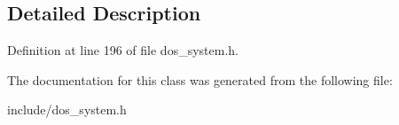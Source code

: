 \subsection{Detailed Description}


Definition at line 196 of file dos\-\_\-system.\-h.



The documentation for this class was generated from the following file\-:\begin{DoxyCompactItemize}
\item 
include/dos\-\_\-system.\-h\end{DoxyCompactItemize}
